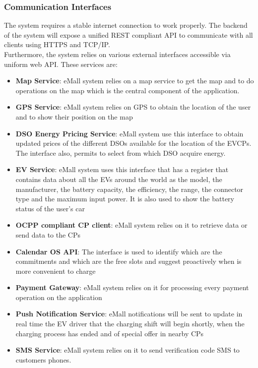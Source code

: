 \subsubsection{Communication Interfaces}
The system requires a stable internet connection to work properly.
The backend of the system will expose a unified REST compliant API to communicate
with all clients using HTTPS and TCP/IP.
\\Furthermore, the system relies on various external interfaces accessible via uniform web API. These services are:
\begin{itemize}
    \item \textbf{Map Service}: eMall system relies on a map service to get the map and to do operations on the map which is the central component of the application.
    \item \textbf{GPS Service}: eMall system relies on GPS to obtain the location of the user and to show their position on the map
    \item \textbf{DSO Energy Pricing Service}: eMall system use this interface to obtain updated prices of the different DSOs available for the location of the EVCPs. The interface also, permits to select from which DSO acquire energy.
    \item \textbf{EV Service}: eMall system uses this interface that has a register that contains data about all the EVs around the world as the model, the manufacturer, the battery capacity, the efficiency, the range, the connector type and the maximum input power. It is also used to show the battery status of the user's car
    \item \textbf{OCPP compliant CP client}: eMall system relies on it to retrieve data or send data to the CPs
    \item \textbf{Calendar OS API}: The interface is used to identify which are the commitments and which are the free slots and suggest proactively when is more convenient to charge
    \item \textbf{Payment Gateway}: eMall system relies on it for processing every payment operation on the application
    \item \textbf{Push Notification Service}: eMall notifications will be sent to update in real time the EV driver that the charging shift will begin shortly, when the charging process has ended and of special offer in nearby CPs
    \item \textbf{SMS Service}: eMall system relies on it to send verification code SMS to customers phones.
\end{itemize}



